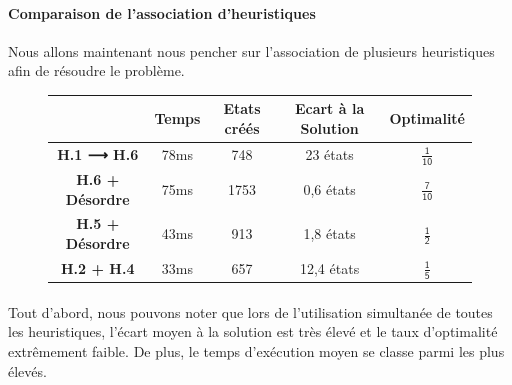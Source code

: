 \documentclass[10pt,a4paper]{report}
\begin{document}
\paragraph{Comparaison de l'association d'heuristiques}{Nous allons maintenant nous pencher sur l'association de plusieurs heuristiques afin de résoudre le problème.}

{\scriptsize{}
\renewcommand{\arraystretch}{1.3}
\vspace*{.5cm}
\begin{figure}[h!]
\centering
\begin{tabular}{| c | c | c | c | c |} \hline
\textbf{ } & \textbf{Temps} & \textbf{Etats créés} & \textbf{Ecart à la Solution} & \textbf{Optimalité} \\ \hline
\textbf{H.1 ⟶ H.6} & 78ms & 748 & 23 états & $\mathsf{\tfrac{1}{10}}$ \\ \hline
\textbf{H.6 + Désordre} & 75ms & 1753 & 0,6 états & $\mathsf{\tfrac{7}{10}}$ \\ \hline
\textbf{H.5 + Désordre}& 43ms & 913 & 1,8 états & $\mathsf{\tfrac{1}{2}}$ \\ \hline
\textbf{H.2 + H.4} & 33ms & 657 & 12,4 états &$\mathsf{\tfrac{1}{5}}$ \\ \hline
\end{tabular}
\end{figure}
\vspace*{0,5cm}
}


\paragraph{}{Tout d'abord, nous pouvons noter que lors de l'utilisation simultanée de toutes les heuristiques, l'écart moyen à la solution est très élevé et le taux d'optimalité extrêmement faible. De plus, le temps d'exécution moyen se classe parmi les plus élevés.}
\end{document}
